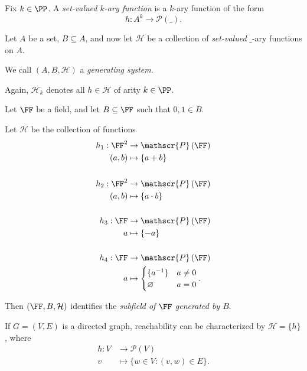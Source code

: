 \documentclass{article}
\newcommand{\powerset}[1]{\ensuremath{\mathscr{P}\left(#1\right)}}
\begin{document}
\begin{definition}
    Fix $k \in \PP$.
    A \textit{set-valued $k$-ary function} is a $k$-ary function of the form
    \[
        h: A^k \to \powerset{\_}.
    \]
\end{definition}



\begin{definition}
Let $A$ be a set, $B \subseteq A$, and now let $\mathcal{H}$ be a collection of \textit{set-valued} $\_$-ary functions on $A$.

    We call $(A, B, \mathcal{H})$ a \textit{generating system}.

    Again, $\mathcal{H}_k$ denotes all $h \in \mathcal{H}$ of arity $k \in \PP$.
\end{definition}

\begin{example}
    Let $\FF$ be a field, and let $B \subseteq \FF$ such that $0,1 \in B$.

    Let $\mathcal{H}$ be the collection of functions 
    \begin{align*}
        h_1: \FF^2 &\to \powerset{\FF} \\
        (a,b) &\mapsto \{a + b\} \\
        \\
        h_2: \FF^2 &\to \powerset{\FF} \\
        (a,b) &\mapsto \{a \cdot b\} \\
        \\
        h_3: \FF &\to \powerset{\FF} \\
        a &\mapsto \{-a\} \\
        \\
        h_4: \FF &\to \powerset{\FF} \\
        a &\mapsto \begin{cases}
            \{a^{-1}\} & a \neq 0 \\
            \varnothing & a = 0
        \end{cases}.
    \end{align*}

    Then $(\FF, B, \mathcal{H})$ identifies the \textit{subfield of $\FF$ generated by $B$}.
\end{example}

\begin{example}
    If $G = (V,E)$ is a directed graph, reachability can be characterized by $\mathcal{H} = \{h\}$, where
    \begin{align*}
        h: V &\to \powerset{V} \\
        v &\mapsto \{w \in V: (v,w) \in E\}.
    \end{align*}
\end{example}
\end{document}
